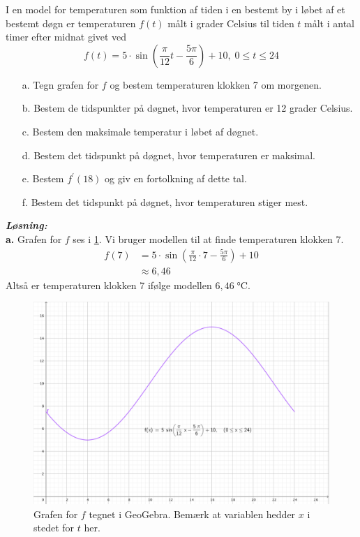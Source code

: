 \documentclass{article}
\newcommand{\sol}{\setlength{\parindent}{0cm}\textbf{\textit{Løsning:}}\setlength{\parindent}{1cm}}
\begin{document}
\begin{question}{}{}
  I en model for temperaturen som funktion af tiden i en bestemt by i løbet af et bestemt døgn er temperaturen $f(t)$ målt i grader Celsius til tiden $t$ målt $\mathrm{i}$ antal timer efter midnat givet ved
$$
f(t)=5 \cdot \sin \left(\frac{\pi}{12} t-\frac{5 \pi}{6}\right)+10 ,\;0 \leq t \leq 24
$$
\begin{itemize}
  \item[a.] Tegn grafen for $f$ og bestem temperaturen klokken 7 om morgenen.
  \item[b.] Bestem de tidspunkter på døgnet, hvor temperaturen er 12 grader Celsius.
  \item[c.] Bestem den maksimale temperatur i løbet af døgnet.
  \item[d.] Bestem det tidspunkt på døgnet, hvor temperaturen er maksimal.
  \item[e.] Bestem $f^{\prime}(18)$ og giv en fortolkning af dette tal.
  \item[f.] Bestem det tidspunkt på døgnet, hvor temperaturen stiger mest.
\end{itemize}
\end{question}
\sol \\ 
\textbf{a.} Grafen for $f$ ses i \cref{fig:tid}.
Vi bruger modellen til at finde temperaturen klokken 7.
\begin{equation*}
\begin{split}
  f(7)&= 5 \cdot \sin \left(\frac{\pi}{12} \cdot 7-\frac{5 \pi}{6}\right)+10 \\ 
  &\approx 6,46
\end{split}
\end{equation*}
Altså er temperaturen klokken 7 ifølge modellen $6,46 \;\unit{\celsius}$.
\begin{figure}[H]
\begin{center}
  \includegraphics[width=\textwidth]{tid.png}
\end{center}
\caption{Grafen for $f$ tegnet i GeoGebra. Bemærk at variablen hedder $x$ i stedet for $t$ her.}
\label{fig:tid}
\end{figure}
\end{document}
